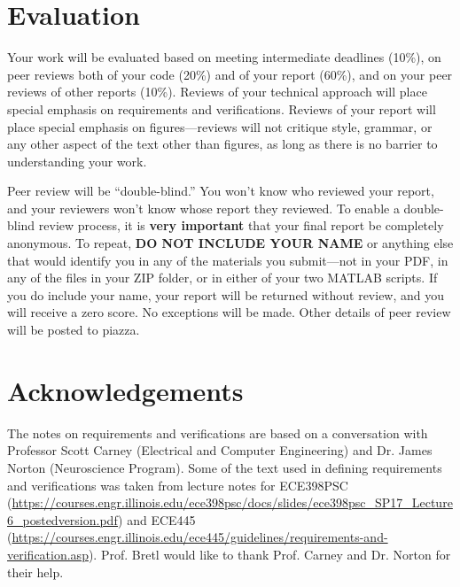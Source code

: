 \documentclass[12pt]{article}
\begin{document}
\section{Evaluation}

Your work will be evaluated based on meeting intermediate deadlines (10\%), on peer reviews both of your code (20\%) and of your report (60\%), and on your peer reviews of other reports (10\%). Reviews of your technical approach will place special emphasis on requirements and verifications. Reviews of your report will place special emphasis on figures---reviews will not critique style, grammar, or any other aspect of the text other than figures, as long as there is no barrier to understanding your work.

Peer review will be ``double-blind.'' You won't know who reviewed your report, and your reviewers won't know whose report they reviewed. To enable a double-blind review process, it is \textbf{very important} that your final report be completely anonymous. To repeat, \textbf{DO NOT INCLUDE YOUR NAME} or anything else that would identify you in any of the materials you submit---not in your PDF, in any of the files in your ZIP folder, or in either of your two MATLAB scripts. If you do include your name, your report will be returned without review, and you will receive a zero score. No exceptions will be made.
Other details of peer review will be posted to piazza.


\section*{Acknowledgements}

The notes on requirements and verifications are based on a conversation with Professor Scott Carney (Electrical and Computer Engineering) and Dr. James Norton (Neuroscience Program). Some of the text used in defining requirements and verifications was taken from lecture notes for ECE398PSC (\url{https://courses.engr.illinois.edu/ece398psc/docs/slides/ece398psc_SP17_Lecture6_postedversion.pdf}) and ECE445 (\url{https://courses.engr.illinois.edu/ece445/guidelines/requirements-and-verification.asp}). Prof. Bretl would like to thank Prof. Carney and Dr. Norton for their help.







\end{document}
